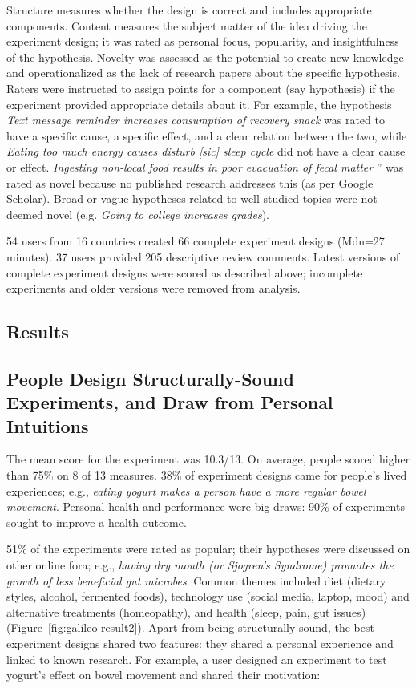 Structure measures whether the design is correct and includes appropriate components. Content measures the subject matter of the idea driving the experiment design; it was rated as personal focus, popularity, and insightfulness of the hypothesis. Novelty was assessed as the potential to create new knowledge and operationalized as the lack of research papers about the specific hypothesis. Raters were instructed to assign points for a component (say hypothesis) if the experiment provided appropriate details about it. For example, the hypothesis \textit{Text message reminder increases consumption of recovery snack} was rated to have a specific cause, a specific effect, and a clear relation between the two, while \textit{Eating too much energy causes disturb [sic] sleep cycle} did not have a clear cause or effect. \textit{Ingesting non-local food results in poor evacuation of fecal matter} '' was rated as novel because no published research addresses this (as per Google Scholar). Broad or vague hypotheses related to well-studied topics were not deemed novel (e.g. \textit{Going to college increases grades}).

54 users from 16 countries created 66 complete experiment designs (Mdn=27 minutes). 37 users provided 205 descriptive review comments. Latest versions of complete experiment designs were scored as described above; incomplete experiments and older versions were removed from analysis. 

\subsection*{Results}
\subsection{People Design Structurally-Sound Experiments, and Draw from Personal Intuitions}
The mean score for the experiment was 10.3/13. On average, people scored higher than 75\% on 8 of 13 measures. 38\% of experiment designs came for people's lived experiences; e.g., \textit{eating yogurt makes a person have a more regular bowel movement}. Personal health and performance were big draws: 90\% of experiments sought to improve a health outcome. 

51\% of the experiments were rated as popular; their hypotheses were discussed on other online fora; e.g., \textit{having dry mouth (or Sjogren's Syndrome) promotes the growth of less beneficial gut microbes}. Common themes included diet (dietary styles, alcohol, fermented foods), technology use (social media, laptop, mood) and alternative treatments (homeopathy), and health (sleep, pain, gut issues) (Figure~\ref{fig:galileo-result2}). Apart from being structurally-sound, the best experiment designs shared two features: they shared a personal experience and linked to known research. For example, a user designed an experiment to test yogurt's effect on bowel movement and shared their motivation: 

